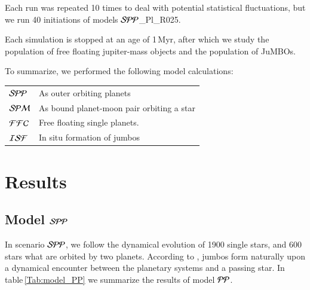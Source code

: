 \documentclass[aa]{lib/aa}
\newcommand{\jumbos}{\mbox{JuMBOs}}
\begin{document}
Each run was repeated 10 times to deal with potential statistical
fluctuations, but we run 40 initiations of models ${\cal SPP}$\_Pl\_R025.

Each simulation is stopped at an age of 1\,Myr, after which we study
the population of free floating jupiter-mass objects and the
population of \jumbos.

To summarize, we performed the following model calculations:\\
\begin{tabular}{ll}
${\cal SPP}$ & As outer orbiting planets\\
${\cal SPM}$ & As bound planet-moon pair orbiting a star\\
${\cal FFC}$ & Free floating single planets.\\
${\cal ISF}$ & In situ formation of jumbos\\
\end{tabular}

\section{Results}

\subsection{Model ${\cal SPP}$}

In scenario ${\cal SPP}$, we follow the dynamical evolution of 1900
single stars, and 600 stars what are orbited by two planets.  According
to \cite{2023arXiv231006016W}, jumbos form naturally upon a dynamical
encounter between the planetary systems and a passing star.  In
table\,\ref{Tab:model_PP} we summarize the results of model ${\cal
  PP}$.
\end{document}
